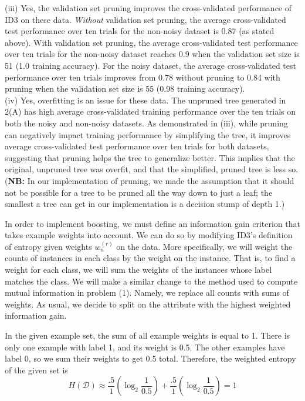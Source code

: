 \documentclass[solution, letterpaper]{cs121}
\begin{document}
(iii) Yes, the validation set pruning improves the cross-validated performance of ID3 on these data. \emph{Without} validation set pruning, the average cross-validated test performance over ten trials for the non-noisy dataset is 0.87 (as stated above). With validation set pruning, the average cross-validated test performance over ten trials for the non-noisy dataset reaches 0.9 when the validation set size is 51 (1.0 training accuracy). For the noisy dataset, the average cross-validated test performance over ten trials improves from 0.78 without pruning to 0.84 with pruning when the validation set size is 55 (0.98 training accuracy). \\

(iv) Yes, overfitting is an issue for these data. The unpruned tree generated in 2(A) has high average cross-validated training performance over the ten trials on both the noisy and non-noisy datasets. As demonstrated in (iii), while pruning can negatively impact training performance by simplifying the tree, it improves average cross-validated test performance over ten trials for both datasets, suggesting that pruning helps the tree to generalize better. This implies that the original, unpruned tree was overfit, and that the simplified, pruned tree is less so. ({\bf NB:} In our implementation of pruning, we made the assumption that it should not be possible for a tree to be pruned all the way down to just a leaf; the smallest a tree can get in our implementation is a decision stump of depth 1.)

\subproblem In order to implement boosting, we must define an information gain criterion that takes example weights into account. We can do so by modifying ID3's definition of entropy given weights $w_n^{(r)}$ on the data. More specifically, we will weight the counts of instances in each class by the weight on the instance. That is, to find a weight for each class, we will sum the weights of the instances whose label matches the class. We will make a similar change to the method used to compute mutual information in problem (1). Namely, we replace all counts with sums of weights. As usual, we decide to split on the attribute with the highest weighted information gain.

In the given example set, the sum of all example weights is equal to 1. There is only one example with label 1, and its weight is 0.5. The other examples have label 0, so we sum their weights to get 0.5 total. Therefore, the weighted entropy of the given set is
\[ H(\mathcal D) \approx \frac{.5}{1} (\log_2 \frac{1}{0.5}) + \frac{.5}{1} (\log_2 \frac{1}{0.5}) = 1 \]
\end{document}
